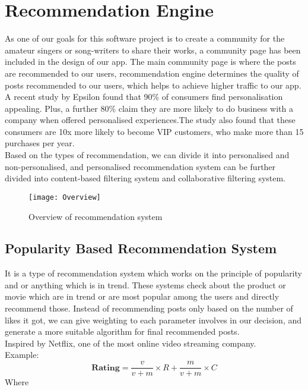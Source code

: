 
\chapter{Recommendation Engine}%

\label{Chapter6} %

As one of our goals for this software project is to create a community for the amateur singers or song-writers to share their works, a community page has been included in the design of our app. The main community page is where the posts are recommended to our users, recommendation engine determines the quality of posts recommended to our users, which helps to achieve higher traffic to our app.
\\ A recent study by Epsilon found that 90\% of consumers find personalisation appealing. Plus, a further 80\% claim they are more likely to do business with a company when offered personalised experiences.The study also found that these consumers are 10x more likely to become VIP customers, who make more than 15 purchases per year.
\\Based on the types of recommendation, we can divide it into personalised and non-personalised, and personalised recommendation system can be further divided into content-based filtering system and collaborative filtering system.
\begin{figure}[ht]
\centering
\texttt{[image: Overview]}
\caption{Overview of recommendation system}
\end{figure}



\section{Popularity Based Recommendation System}
It is a type of recommendation system which works on the principle of popularity and or anything which is in trend. These systems check about the product or movie which are in trend or are most popular among the users and directly recommend those. Instead of recommending posts only based on the number of likes it got, we can give weighting to each parameter involves in our decision, and generate a more suitable algorithm for final recommended posts.
\\Inspired by Netflix, one of the most online video streaming company.
\\Example:
\begin{equation}
\textbf{Rating} = \frac{v}{v+m} \times R + \frac{m}{v+m} \times C
\end{equation}
Where 






